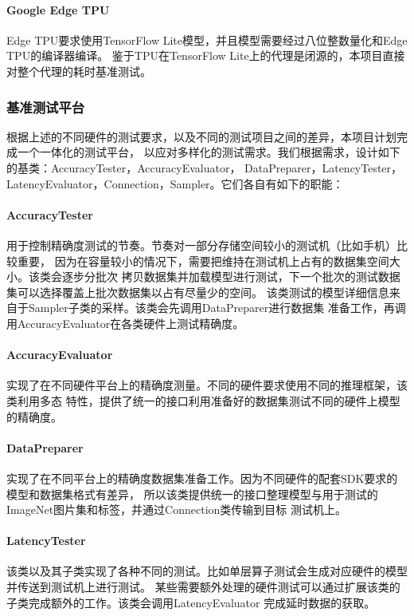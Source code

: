 \paragraph{Google Edge TPU}
Edge TPU要求使用TensorFlow Lite模型，并且模型需要经过八位整数量化和Edge TPU的编译器编译。
鉴于TPU在TensorFlow Lite上的代理是闭源的，本项目直接对整个代理的耗时基准测试。

\subsubsection{基准测试平台}
根据上述的不同硬件的测试要求，以及不同的测试项目之间的差异，本项目计划完成一个一体化的测试平台，
以应对多样化的测试需求。我们根据需求，设计如下的基类：AccuracyTester，AccuracyEvaluator，
DataPreparer，LatencyTester，LatencyEvaluator，Connection，Sampler。它们各自有如下的职能：

\paragraph{AccuracyTester}
用于控制精确度测试的节奏。节奏对一部分存储空间较小的测试机（比如手机）比较重要，
因为在容量较小的情况下，需要把维持在测试机上占有的数据集空间大小。该类会逐步分批次
拷贝数据集并加载模型进行测试，下一个批次的测试数据集可以选择覆盖上批次数据集以占有尽量少的空间。
该类测试的模型详细信息来自于Sampler子类的采样。该类会先调用DataPreparer进行数据集
准备工作，再调用AccuracyEvaluator在各类硬件上测试精确度。

\paragraph{AccuracyEvaluator}
实现了在不同硬件平台上的精确度测量。不同的硬件要求使用不同的推理框架，该类利用多态
特性，提供了统一的接口利用准备好的数据集测试不同的硬件上模型的精确度。

\paragraph{DataPreparer}
实现了在不同平台上的精确度数据集准备工作。因为不同硬件的配套SDK要求的模型和数据集格式有差异，
所以该类提供统一的接口整理模型与用于测试的ImageNet图片集和标签，并通过Connection类传输到目标
测试机上。

\paragraph{LatencyTester}
该类以及其子类实现了各种不同的测试。比如单层算子测试会生成对应硬件的模型并传送到测试机上进行测试。
某些需要额外处理的硬件测试可以通过扩展该类的子类完成额外的工作。该类会调用LatencyEvaluator
完成延时数据的获取。


